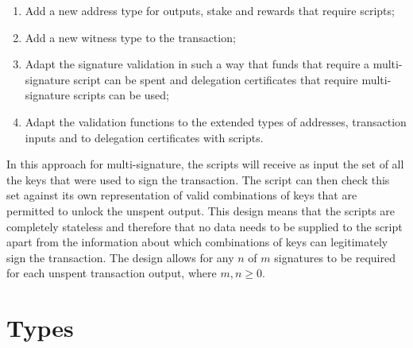 \documentclass[11pt,a4paper,dvipsnames,twosided]{article}
\theoremstyle{definition}
\begin{document}
\begin{enumerate}
\item Add a new address type for outputs, stake and rewards that require scripts;
\item Add a new witness type to the transaction;
\item Adapt the signature validation in such a way that funds that require a
  multi-signature script can be spent and delegation certificates that require
  multi-signature scripts can be used;
\item Adapt the validation functions to the extended types of
  addresses, transaction inputs and to delegation certificates with scripts.
\end{enumerate}

In this approach for multi-signature, the scripts will receive as input the set of
all the keys that were used to sign the transaction. The script can then check this set
against its own representation of valid combinations of keys that are permitted to unlock the
unspent output.
%
This design means that the scripts are completely stateless and therefore that no data needs to be
supplied to the script apart from the information about which combinations of keys
can legitimately sign the transaction. The design allows for any $n$ of $m$
signatures to be required for each unspent transaction output, where $m, n \ge 0$.

\section{Types}
\label{sec:types}
\end{document}
